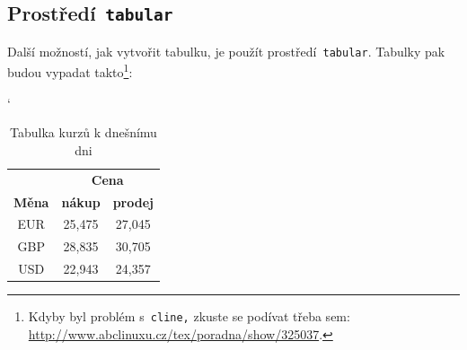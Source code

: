 \documentclass[a4paper, 11pt]{article}
\begin{document}
\subsection{Prostředí\texttt{ tabular}}
Další možností, jak vytvořit tabulku, je použít prostředí\texttt{ tabular}. Tabulky pak budou vypadat takto\footnote{Kdyby byl problém s\texttt{ cline,} zkuste se podívat třeba sem: \hyperlink{http://www.abclinuxu.cz/tex/poradna/show/325037}{http://www.abclinuxu.cz/tex/poradna/show/325037}.}:
\bigskip
\begin{table}[h]
\begin{center}
    

\catcode`
\begin{tabular}{|c|c|c|}
\hline
    & \multicolumn{2}{c|}{\textbf{Cena}} \\
    \cline{2-3}    
     \textbf{Měna} & \textbf{nákup} & \textbf{prodej}\\
    \hline
    EUR & 25,475 & 27,045\\
    GBP & 28,835 & 30,705\\
    USD & 22,943 & 24,357\\
\hline
\end{tabular}

\caption{Tabulka kurzů k dnešnímu dni} \label{tabulka1}
\end{center}
\end{table}
\end{document}
